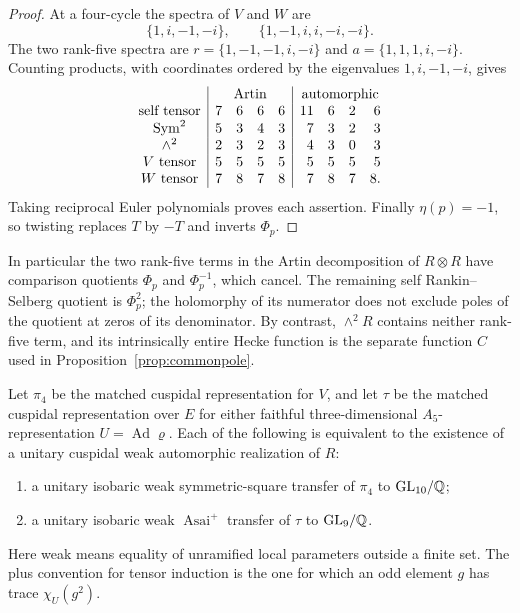 \begin{proof}
At a four-cycle the spectra of $V$ and $W$ are
\[
\{1,i,-1,-i\},\qquad\{1,-1,i,i,-i,-i\}.
\]
The two rank-five spectra are $r=\{1,-1,-1,i,-i\}$ and $a=\{1,1,1,i,-i\}$. Counting products, with coordinates ordered by the eigenvalues $1,i,-1,-i$, gives
\[
\begin{array}{c|rrrr|rrrr}
 &\multicolumn{4}{c|}{\text{Artin}}&\multicolumn{4}{c}{\text{automorphic}}\\
\text{self tensor}&7&6&6&6&11&6&2&6\\
\operatorname{Sym}^2&5&3&4&3&7&3&2&3\\
\wedge^2&2&3&2&3&4&3&0&3\\
V\text{ tensor}&5&5&5&5&5&5&5&5\\
W\text{ tensor}&7&8&7&8&7&8&7&8.
\end{array}
\]
Taking reciprocal Euler polynomials proves each assertion. Finally $\eta(p)=-1$, so twisting replaces $T$ by $-T$ and inverts $\Phi_p$.
\end{proof}

In particular the two rank-five terms in the Artin decomposition of $R\otimes R$ have comparison quotients $\Phi_p$ and $\Phi_p^{-1}$, which cancel. The remaining self Rankin--Selberg quotient is $\Phi_p^2$; the holomorphy of its numerator does not exclude poles of the quotient at zeros of its denominator. By contrast, $\wedge^2R$ contains neither rank-five term, and its intrinsically entire Hecke function is the separate function $C$ used in Proposition~\ref{prop:commonpole}.

\begin{proposition}\label{prop:transfer-equivalence}
Let $\pi_4$ be the matched cuspidal representation for $V$, and let $\tau$ be the matched cuspidal representation over $E$ for either faithful three-dimensional $A_5$-representation $U=\operatorname{Ad}\varrho$. Each of the following is equivalent to the existence of a unitary cuspidal weak automorphic realization of $R$:
\begin{enumerate}[label=(\roman*)]
\item a unitary isobaric weak symmetric-square transfer of $\pi_4$ to $\mathrm{GL}_{10}/\mathbb Q$;
\item a unitary isobaric weak $\operatorname{Asai}^+$ transfer of $\tau$ to $\mathrm{GL}_9/\mathbb Q$.
\end{enumerate}
Here weak means equality of unramified local parameters outside a finite set. The plus convention for tensor induction is the one for which an odd element $g$ has trace $\chi_U(g^2)$.
\end{proposition}

